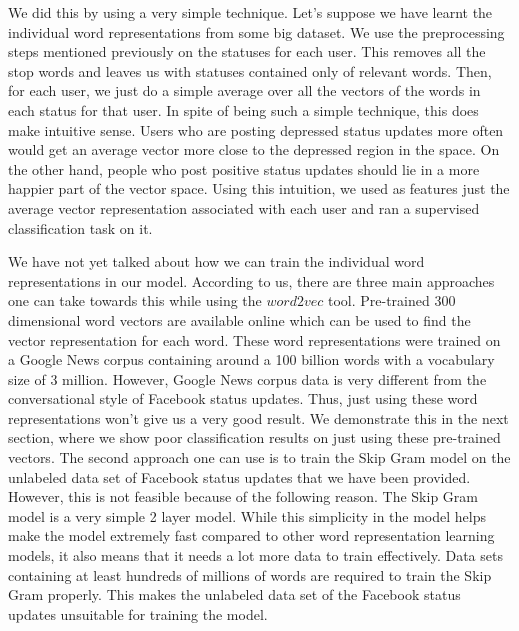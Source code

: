 We did this by using a very simple technique. Let's suppose we have learnt the individual word representations from some big dataset. We use the preprocessing steps mentioned previously on the statuses for each user. This removes all the stop words and leaves us with statuses contained only of relevant words. Then, for each user, we just do a simple average over all the vectors of the words in each status for that user. In spite of being such a simple technique, this does make intuitive sense. Users who are posting depressed status updates more often would get an average vector more close to the depressed region in the space. On the other hand, people who post positive status updates should lie in a more happier part of the vector space. Using this intuition, we used as features just the average vector representation associated with each user and ran a supervised classification task on it.

We have not yet talked about how we can train the individual word representations in our model. According to us, there are three main approaches one can take towards this while using the $word2vec$ tool. Pre-trained 300 dimensional word vectors are available online which can be used to find the vector representation for each word. These word representations were trained on a Google News corpus containing around a 100 billion words with a vocabulary size of 3 million. However, Google News corpus data is very different from the conversational style of Facebook status updates. Thus, just using these word representations won't give us a very good result. We demonstrate this in the next section, where we show poor classification results on just using these pre-trained vectors. The second approach one can use is to train the Skip Gram model on the unlabeled data set of Facebook status updates that we have been provided. However, this is not feasible because of the following reason. The Skip Gram model is a very simple 2 layer model. While this simplicity in the model helps make the model extremely fast compared to other word representation learning models, it also means that it needs a lot more data to train effectively. Data sets containing at least hundreds of millions of words are required to train the Skip Gram properly. This makes the unlabeled data set of the Facebook status updates unsuitable for training the model.

